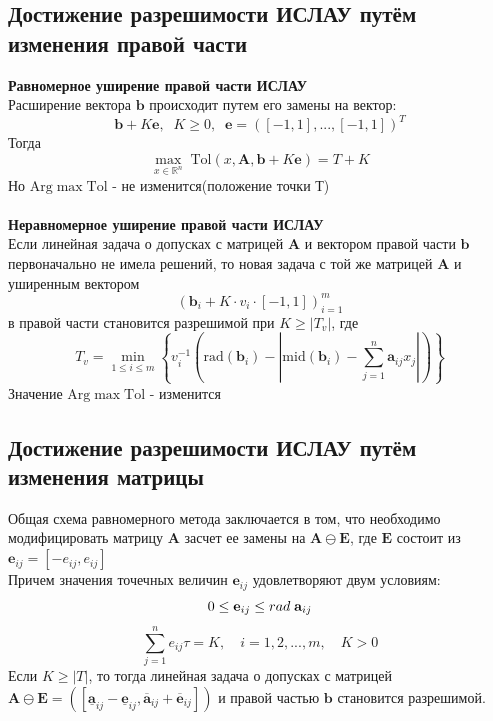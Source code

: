 \documentclass[a4paper,12pt]{article}
\begin{document}
\subsection{Достижение разрешимости ИСЛАУ путём изменения правой части}
\textbf{Равномерное уширение правой части
ИСЛАУ}\\
Расширение вектора $\textbf{b}$ происходит путем его замены на вектор: 
\begin{equation}
    \textbf{b}+K\textbf{e}, \;\; K\geq 0, \;\; \textbf{e}=([-1, 1],...,[-1, 1])^T
\end{equation}
Тогда
\begin{equation}
\max_{x\in \mathbb{R}^n} \;\mathrm{Tol}(x, \mathbf{A},\mathbf{b}+K\textbf{e}) = T + K
\end{equation}
Но $\mathrm{Arg}\max\mathrm{Tol}$ - не изменится(положение точки Т) \\
\\
\textbf{Неравномерное уширение правой части
ИСЛАУ}\\
Если линейная задача о допусках с матрицей $\textbf{A}$ и вектором правой части $\textbf{b}$ первоначально не имела решений, то новая задача с той же матрицей  $\textbf{A}$ и уширенным вектором
\begin{equation}
    (\textbf{b}_i+K\cdot v_i\cdot [-1,1])_{i=1}^m
\end{equation}
в правой части становится разрешимой при $K\geq |T_v|$, где
\begin{equation}
    T_v=\min_{1\leq i\leq m}\left\{v_i^{-1}\left(\mathrm{rad}(\mathbf{b}_i)-\left|\mathrm{mid}(\mathbf{b}_i)-\sum_{j=1}^n \mathbf{a}_{ij}x_j\right|\right)\right\}
\end{equation}
Значение $\mathrm{Arg}\max\mathrm{Tol}$ -  изменится
\subsection{Достижение разрешимости ИСЛАУ путём изменения матрицы}
Общая схема равномерного метода заключается в том, что необходимо модифицировать матрицу $\textbf{A}$ засчет ее замены на $\mathbf{A}\ominus \mathbf{E}$, где 
$\mathbf{E}$ состоит из $\mathbf{e}_{ij}=[-e_{ij}, e_{ij}]$ \\
Причем значения точечных величин $\mathbf{e}_{ij}$ удовлетворяют двум условиям:
\begin{equation}
    0 \leq \mathbf{e}_{ij} \leq rad{\;\mathbf{a}_{ij}} \\
\end{equation}
\begin{equation}
    \sum_{j=1}^n e_{ij}\tau=K, \quad i=1,2,...,m, \quad K>0
\end{equation}
Если $K\geq |T|$, то тогда линейная задача о допусках с матрицей $\mathbf{A}\ominus\mathbf{E}=([\underline{\mathbf{a}}_{ij}-\underline{\mathbf{e}}_{ij},\overline{\mathbf{a}}_{ij}+\overline{\mathbf{e}}_{ij}])$ и правой частью $\textbf{b}$ становится разрешимой.
\end{document}
